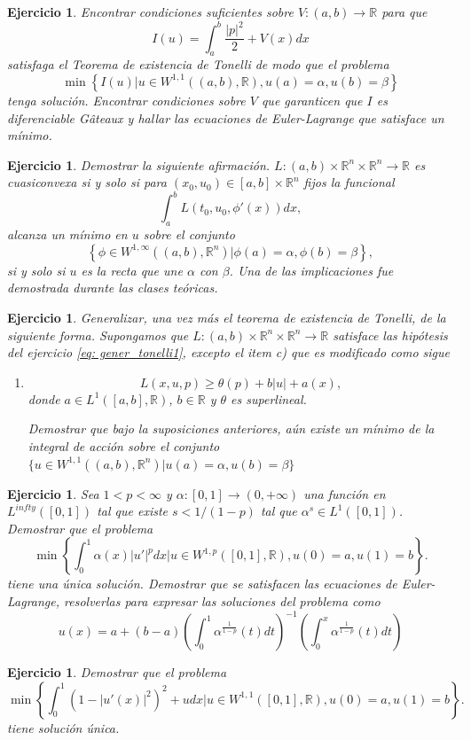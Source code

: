 \documentclass{article}
\newcounter{ejer}
\newtheorem{ejercicio}[ejer]{Ejercicio}}
\newcommand{\rr}{\mathbb{R}}
\begin{document}
\begin{ejercicio} Encontrar condiciones suficientes sobre $V:(a,b)\to\rr$ para que
\[I(u)=\int_a^b\frac{|p|^2}{2}+V(x)dx\]
satisfaga el Teorema de existencia de Tonelli de modo que el problema
\[\min\left\{I(u)\bigg| u\in W^{1,1}((a,b),\rr), u(a)=\alpha, u(b)=\beta\right\}\]
tenga solución. Encontrar condiciones  sobre $V$ que garanticen que $I$ es diferenciable G\^ateaux y hallar las ecuaciones de Euler-Lagrange que satisface un mínimo.

\end{ejercicio}

\begin{ejercicio} Demostrar la siguiente afirmación. $L:(a,b)\times\rr^n\times\rr^n\to\rr$ es cuasiconvexa si y solo si para $(x_0,u_0)\in [a,b]\times\rr^n$ fijos la funcional
\[\int_a^bL(t_0,u_0,\phi'(x))dx,\]
alcanza un mínimo en $u$ sobre el conjunto
\[\left\{\phi\in W^{1,\infty}((a,b),\rr^n)| \phi(a)=\alpha, \phi(b)=\beta\right\},\]
si y solo si $u$ es la recta que une $\alpha$ con $\beta$. Una de las implicaciones fue demostrada durante las clases teóricas.

\end{ejercicio}

\begin{ejercicio} Generalizar, una vez más el teorema de existencia de Tonelli, de la siguiente forma.  Supongamos que $L:(a,b)\times\rr^n\times\rr^n\to\rr$ satisface las hipótesis del ejercicio \ref{eq: gener_tonelli1}, excepto el item c) que es modificado como sigue
\begin{enumerate}
 \item[c')] \[L(x,u,p)\geq \theta(p)+b|u|+a(x),\]
 donde $a\in L^1([a,b],\rr)$, $b\in\rr$  y $\theta$ es superlineal.

 Demostrar que bajo la suposiciones anteriores, aún existe un mínimo de la integral de acción sobre el conjunto $\{u\in W^{1,1}((a,b),\rr^n)| u(a)=\alpha, u(b)=\beta\}$
\end{enumerate}


\end{ejercicio}


\begin{ejercicio} Sea $1<p<\infty$ y $\alpha:[0,1]\to (0,+\infty)$ una función en $ L^{infty}([0,1])$  tal que existe $s<1/(1-p)$ tal que $\alpha^s\in L^{1}([0,1])$. Demostrar que el problema
\[\min\left\{\int_0^1\alpha(x)|u'|^pdx\bigg|u\in W^{1,p}([0,1],\rr), u(0)=a,u(1)=b\right\}.\]
tiene una única solución. Demostrar que se satisfacen las ecuaciones de Euler-Lagrange, resolverlas para expresar las soluciones del problema como
\[u(x)=a+(b-a)\left(\int_0^1\alpha^\frac{1}{1-p}(t)dt\right)^{-1}\left(\int_0^x\alpha^\frac{1}{1-p}(t)dt\right)\]

\end{ejercicio}


\begin{ejercicio} Demostrar que el problema
 \[\min\left\{\int_0^1(1-|u'(x)|^2)^2+udx\bigg|u\in W^{1,1}([0,1],\rr), u(0)=a,u(1)=b\right\}.\]
 tiene solución única.
\end{ejercicio}
\end{document}
